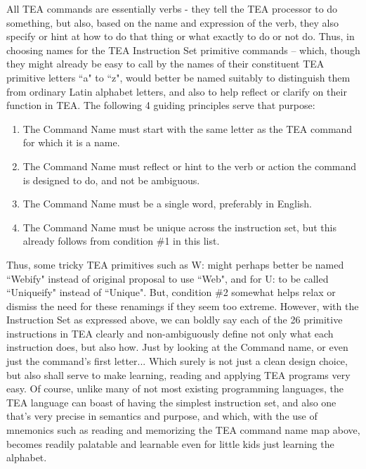 \documentclass[a4paper, 18pt]{book} %
\begin{document}
All TEA commands are essentially verbs - they tell the TEA processor to do something, but also, based on the name and expression of the verb, they also specify or hint at how to do that thing or what exactly to do or not do. Thus, in choosing names for the TEA Instruction Set primitive commands – which, though they might already be easy to call by the names of their constituent TEA primitive letters ``a" to ``z", would better be named suitably to distinguish them from ordinary Latin alphabet letters, and also to help reflect or clarify on their function in TEA. The following 4 guiding principles serve that purpose:


\begin{enumerate}
\item The Command Name must start with the same letter as the TEA command for which it is a name.
\item The Command Name must reflect or hint to the verb or action the command is designed to do, and not be ambiguous.
\item The Command Name must be a single word, preferably in English.
\item The Command Name must be unique across the instruction set, but this already follows from condition \#1 in this list.
\end{enumerate}

Thus, some tricky TEA primitives such as W: might perhaps better be named ``Webify" instead of original proposal to use ``Web", and for U: to be called ``Uniqueify" instead of ``Unique". But, condition \#2 somewhat helps relax or dismiss the need for these renamings if they seem too extreme. However, with the Instruction Set as expressed above, we can boldly say each of the 26 primitive instructions in TEA clearly and non-ambiguously define not only what each instruction does, but also how. Just by looking at the Command name, or even just the command's first letter... Which surely is not just a clean design choice, but also shall serve to make learning, reading and applying TEA programs very easy. Of course, unlike many of not most existing programming languages, the TEA language can boast of having the simplest instruction set, and also one that's very precise in semantics and purpose, and which, with the use of mnemonics such as reading and memorizing the TEA command name map above, becomes readily palatable and learnable even for little kids just learning the alphabet.

\end{document}
